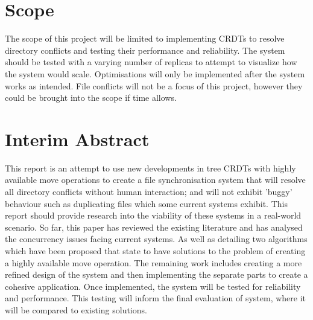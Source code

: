 \documentclass[12pt]{report}
\begin{document}
\section{Scope}
The scope of this project will be limited to implementing CRDTs to resolve directory conflicts and
testing their performance and reliability. The system should be tested with a varying number of
replicas to attempt to visualize how the system would scale. Optimisations will only be
implemented after the system works as intended.
File conflicts will not be a focus of this project, however they could be brought into the scope if
time allows.

\section{Interim Abstract}
This report is an attempt to use new developments in tree CRDTs with
highly available move operations to create a file synchronisation system that
will resolve all directory conflicts without human interaction; and will not
exhibit ’buggy’ behaviour such as duplicating files which some current systems exhibit. This report should provide research into the viability of these
systems in a real-world scenario. So far, this paper has reviewed the existing
literature and has analysed the concurrency issues facing current systems. As
well as detailing two algorithms which have been proposed that state to have
solutions to the problem of creating a highly available move operation.
The remaining work includes creating a more refined design of the system and
then implementing the separate parts to create a cohesive application. Once
implemented, the system will be tested for reliability and performance. This
testing will inform the final evaluation of system, where it will be compared
to existing solutions.

\end{document}
